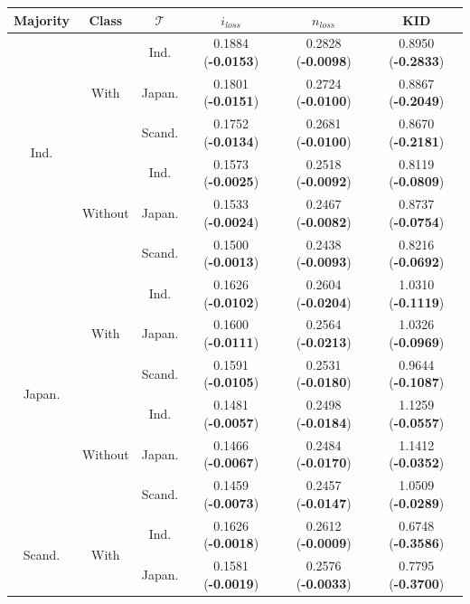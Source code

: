 \begin{table}[H]
\centering
\begin{tabular}{c|c|c|c|c|c}
    \textbf{Majority} & \textbf{Class} & \textbf{$\mathcal{T}$} & \textbf{$i_{loss}$} & \textbf{$n_{loss}$} & \textbf{KID} \\
    \toprule
\multirow{6}{*}{Ind.} & \multirow{3}{*}{With} &  Ind.     & 0.1884 (\textbf{-0.0153})       & 0.2828 (\textbf{-0.0098})       & 0.8950 (\textbf{-0.2833}) \\
 &  & Japan.   & 0.1801 (\textbf{-0.0151})       & 0.2724 (\textbf{-0.0100})       & 0.8867 (\textbf{-0.2049})   \\
 &  & Scand. & 0.1752 (\textbf{-0.0134})       & 0.2681 (\textbf{-0.0100})       & 0.8670 (\textbf{-0.2181})  \\
\hhline{~-----}
 & \multirow{3}{*}{Without} & Ind.     & 0.1573 (\textbf{-0.0025})       & 0.2518 (\textbf{-0.0092})       & 0.8119 (\textbf{-0.0809})    \\
 &  & Japan.   & 0.1533 (\textbf{-0.0024})       & 0.2467 (\textbf{-0.0082})       & 0.8737 (\textbf{-0.0754})  \\
 &  & Scand. & 0.1500 (\textbf{-0.0013})       & 0.2438 (\textbf{-0.0093})       & 0.8216 (\textbf{-0.0692})   \\
\midrule
\multirow{6}{*}{Japan.} & \multirow{3}{*}{With} & Ind.     & 0.1626 (\textbf{-0.0102})       & 0.2604 (\textbf{-0.0204})       & 1.0310 (\textbf{-0.1119})   \\
 &  & Japan.   & 0.1600 (\textbf{-0.0111})       & 0.2564 (\textbf{-0.0213})       & 1.0326 (\textbf{-0.0969}) \\
 &  & Scand. & 0.1591 (\textbf{-0.0105})       & 0.2531 (\textbf{-0.0180})       & 0.9644 (\textbf{-0.1087})  \\
\hhline{~-----}
 & \multirow{3}{*}{Without} & Ind.     & 0.1481 (\textbf{-0.0057})       & 0.2498 (\textbf{-0.0184})       & 1.1259 (\textbf{-0.0557})   \\
 &  & Japan.   & 0.1466 (\textbf{-0.0067})       & 0.2484 (\textbf{-0.0170})       & 1.1412 (\textbf{-0.0352})  \\
 &  & Scand. & 0.1459 (\textbf{-0.0073})       & 0.2457 (\textbf{-0.0147})       & 1.0509 (\textbf{-0.0289})      \\
\midrule
\multirow{6}{*}{Scand.} & \multirow{3}{*}{With} & Ind.     & 0.1626 (\textbf{-0.0018})       & 0.2612 (\textbf{-0.0009})       & 0.6748 (\textbf{-0.3586})   \\
 &  & Japan.   & 0.1581 (\textbf{-0.0019})       & 0.2576 (\textbf{-0.0033})       & 0.7795 (\textbf{-0.3700})  \\

\end{tabular}
\end{table}
